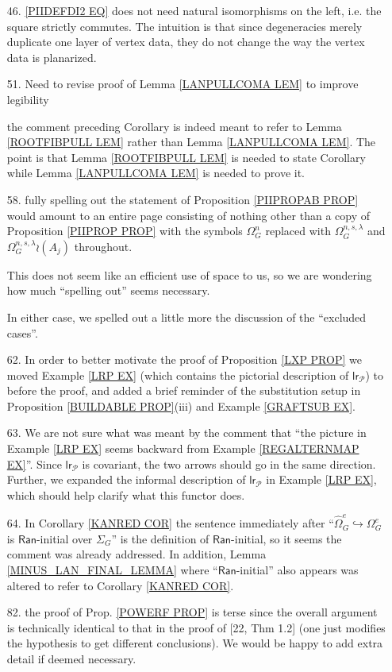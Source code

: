 \documentclass{article}
\begin{document}
\begin{itemize}
	\item[46.] \eqref{PIIDEFDI2 EQ} does not need natural isomorphisms on the left, i.e. the square strictly commutes. The intuition is that since degeneracies merely duplicate one layer of vertex data, they do not change the way the vertex data is planarized. 

	\item[51.] 
	{\color{red} Need to revise proof of Lemma \ref{LANPULLCOMA LEM}
	to improve legibility}
	
	the comment preceding Corollary \label{MONDEFCOR COR}
	is indeed meant to refer to Lemma \ref{ROOTFIBPULL LEM}
	rather than Lemma \ref{LANPULLCOMA LEM}.
	The point is that Lemma \ref{ROOTFIBPULL LEM}
	is needed to state Corollary \label{MONDEFCOR COR}
	while 
	Lemma \ref{LANPULLCOMA LEM} is needed to prove it.

	\item[58.]
	fully spelling out the statement of
	Proposition \ref{PIIPROPAB PROP}
	would amount to an entire page
	consisting of nothing other than a copy of 
	Proposition \ref{PIIPROP PROP}
	with the symbols 
	$\Omega^n_G$
	replaced with 
	$\Omega^{n,s,\lambda}_{G}$ and
	$\Omega^{n,s,\lambda}_{G} \wr (A_j)$
	throughout.
	
	This does not seem like an efficient use of space to us, 
	so we are wondering how much ``spelling out'' seems necessary.
	
	In either case, we spelled out a little more the discussion of the ``excluded cases''.

	\item[62.] 
	In order to better motivate the proof of 
	Proposition \ref{LXP PROP}
	we moved Example \ref{LRP EX}
	(which contains the pictorial description of $\mathsf{lr}_{\mathcal{P}}$) to before the proof,
	and added a brief reminder of the substitution setup in 
	Proposition \ref{BUILDABLE PROP}(iii)
	and Example \ref{GRAFTSUB EX}.

	\item[63.]
	We are not sure what was meant by the comment that
	``the picture in Example \ref{LRP EX} seems backward from
	Example \ref{REGALTERNMAP EX}''.
	Since $\mathsf{lr}_{\mathcal{P}}$
	is covariant, the two arrows should go in the same direction.
	Further, we expanded the informal description
	of $\mathsf{lr}_{\mathcal{P}}$
	in Example \ref{LRP EX},
	which should help clarify what this functor does.
	
	\item[64.]
	In Corollary \ref{KANRED COR} the sentence immediately after ``$\widehat{\Omega}^e_G \hookrightarrow \Omega^e_G$ is
	$\mathsf{Ran}$-initial over $\Sigma_G$''
	is the definition of $\mathsf{Ran}$-initial,
	so it seems the comment was already addressed.
	In addition, Lemma \ref{MINUS_LAN_FINAL_LEMMA} where ``$\mathsf{Ran}$-initial'' also appears was altered to refer to Corollary \ref{KANRED COR}.
	\item[82.] the proof of Prop. \ref{POWERF PROP} is terse since the overall argument is technically identical to that in the proof of [22, Thm 1.2] (one just modifies the hypothesis to get different conclusions).
	We would be happy to add extra detail if deemed necessary. 


\end{itemize}
\end{document}
